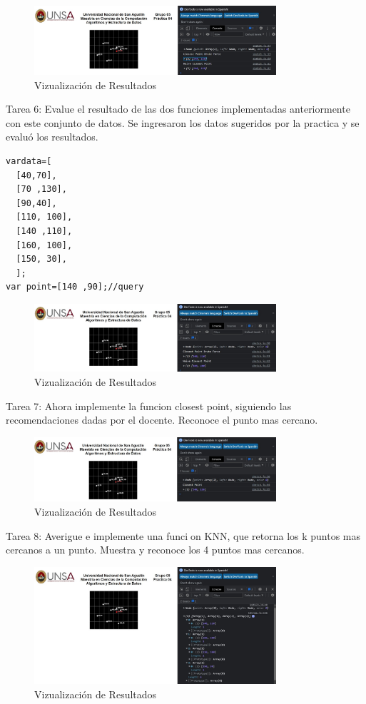 \documentclass{article}
\begin{document}
\begin{figure}[H]
\centering
\includegraphics[width=0.8\textwidth]{img/Resultado5.jpg}
\caption{Vizualización de Resultados}
\end{figure}

Tarea 6: Evalue el resultado de las dos funciones implementadas anteriormente con este conjunto de datos.
Se ingresaron los datos sugeridos por la practica y se evaluó los resultados.
\begin{lstlisting}[style=C]
vardata=[
  [40,70],
  [70 ,130],
  [90,40],
  [110, 100],
  [140 ,110],
  [160, 100],
  [150, 30],
  ];
var point=[140 ,90];//query
\end{lstlisting}

\begin{figure}[H]
\centering
\includegraphics[width=0.8\textwidth]{img/Resultado6.jpg}
\caption{Vizualización de Resultados}
\end{figure}

Tarea 7: Ahora implemente la funcion closest point, siguiendo las recomendaciones dadas por el docente.
Reconoce el punto mas cercano.
\begin{figure}[H]
\centering
\includegraphics[width=0.8\textwidth]{img/Resultado7.jpg}
\caption{Vizualización de Resultados}
\end{figure}

Tarea 8: Averigue e implemente una funcion KNN, que retorna los k puntos mas cercanos a un punto.
Muestra y reconoce los 4 puntos mas cercanos.

\begin{figure}[H]
\centering
\includegraphics[width=0.8\textwidth]{img/Resultado8.jpg}
\caption{Vizualización de Resultados}
\end{figure}
\end{document}
